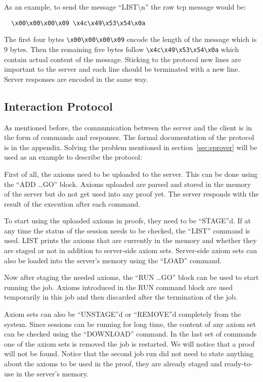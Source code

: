 As an example, to send the message ``LIST\textbackslash{}n'' the raw \ac{tcp} message would be:
\begin{lstlisting}
  \x00\x00\x00\x09 \x4c\x49\x53\x54\x0a
\end{lstlisting}
The first four bytes \lstinline{\x00\x00\x00\x09} encode the length of the message which is 9 bytes. Then the remaining five bytes follow \lstinline{\x4c\x49\x53\x54\x0a} which contain actual content of the message. Sticking to the protocol new lines are important to the server and each line should be terminated with a new line. Server responses are encoded in the same way.

\subsection{Interaction Protocol}\label{subsec:interactionProtocol}
As mentioned before, the communication between the server and the client is in the form of commands and responses. The formal documentation of the protocol is in the appendix. Solving the problem mentioned in section~\ref{sec:eprover} will be used as an example to describe the protocol:

First of all, the axioms need to be uploaded to the server. This can be done using the ``ADD \ldots GO'' block. Axioms uploaded are parsed and stored in the memory of the server but do not get used into any proof yet. The server responds with the result of the execution after each command.

To start using the uploaded axioms in proofs, they need to be ``STAGE''d. If at any time the status of the session needs to be checked, the ``LIST'' command is used. LIST prints the axioms that are currently in the memory and whether they are staged or not in addition to server-side axiom sets. Server-side axiom sets can also be loaded into the server's memory using the ``LOAD'' command.

Now after staging the needed axioms, the ``RUN \ldots GO'' block can be used to start running the job. Axioms introduced in the RUN command block are used temporarily in this job and then discarded after the termination of the job.

Axiom sets can also be ``UNSTAGE''d or ``REMOVE''d completely from the system. Since sessions can be running for long time, the content of any axiom set can be checked using the ``DOWNLOAD'' command. In the last set of commands one of the axiom sets is removed the job is restarted. We will notice that a proof will not be found. Notice that the second job run did not need to state anything about the axioms to be used in the proof, they are already staged and ready-to-use in the server's memory.
